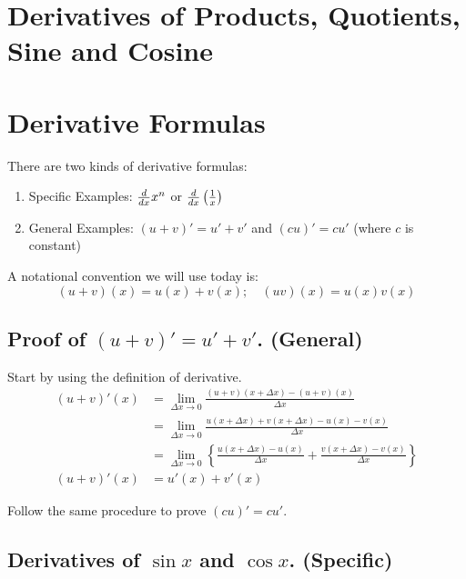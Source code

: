 

\section*{\centering Derivatives of Products, Quotients, Sine and Cosine}  

\bigbreak
\section{Derivative Formulas}

There are two kinds of derivative formulas:

\begin{enumerate}
\item Specific Examples: $\frac{d{}}{d{x}} x^n$ or $\frac{d{}}{d{x}} \left( \frac{1}{x} \right) $
\item General Examples: $(u+v)' = u' + v'$ and $(cu)' = cu'$ (where $c$ is constant)
\end{enumerate}

A notational convention we will use today is:
$$(u+v)(x) = u(x) + v(x); \quad (uv)(x) = u(x)v(x)$$ 

\subsection{Proof of $(u+v)' = u'+v'$. (General)}

Start by using the definition of derivative.
\begin{equation*}
\begin{split}
	(u+v)'(x)	& = \lim_{\Delta x \to 0} \frac{(u+v)(x+\Delta x) - (u+v)(x)}{\Delta x} \\
				& = \lim_{\Delta x \to 0} \frac{u(x+\Delta x)+v(x+\Delta x) - u(x) - v(x)}{\Delta x} \\
				& = \lim_{\Delta x \to 0} \left\{ \frac{u(x+\Delta x) - u(x)}{\Delta x} + \frac{v(x+\Delta x) - v(x)}{\Delta x} \right\} \\
	(u+v)'(x)	& = u'(x) + v'(x)
\end{split}
\end{equation*}

Follow the same procedure to prove $(cu)' = cu'$.

\subsection{Derivatives of $\sin x$ and $\cos x$. (Specific)}

